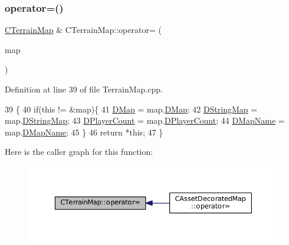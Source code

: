 \subsubsection{\texorpdfstring{operator=()}{operator=()}}
{\footnotesize\ttfamily \hyperlink{classCTerrainMap}{C\+Terrain\+Map} \& C\+Terrain\+Map\+::operator= (\begin{DoxyParamCaption}\item[{const \hyperlink{classCTerrainMap}{C\+Terrain\+Map} \&}]{map }\end{DoxyParamCaption})}



Definition at line 39 of file Terrain\+Map.\+cpp.


\begin{DoxyCode}
39                                                          \{
40     \textcolor{keywordflow}{if}(\textcolor{keyword}{this} != &map)\{
41         \hyperlink{classCTerrainMap_a80d154ce478948b10473534a7bca13f6}{DMap} = map.\hyperlink{classCTerrainMap_a80d154ce478948b10473534a7bca13f6}{DMap};
42         \hyperlink{classCTerrainMap_a76db5fd05e22e0aea413f49175f9c282}{DStringMap} = map.\hyperlink{classCTerrainMap_a76db5fd05e22e0aea413f49175f9c282}{DStringMap};
43         \hyperlink{classCTerrainMap_a79e2cf566ac9dfbaddd2c73ea256785b}{DPlayerCount} = map.\hyperlink{classCTerrainMap_a79e2cf566ac9dfbaddd2c73ea256785b}{DPlayerCount};
44         \hyperlink{classCTerrainMap_a9026e4a5f073885b9e9fc3b43e93caa6}{DMapName} = map.\hyperlink{classCTerrainMap_a9026e4a5f073885b9e9fc3b43e93caa6}{DMapName}; 
45     \}
46     \textcolor{keywordflow}{return} *\textcolor{keyword}{this};
47 \}
\end{DoxyCode}
Here is the caller graph for this function\+:
\nopagebreak
\begin{figure}[H]
\begin{center}
\leavevmode
\includegraphics[width=350pt]{classCTerrainMap_ad9f476d5d4db6de2907dfa3d4d9de7e6_icgraph}
\end{center}
\end{figure}
\hypertarget{classCTerrainMap_a7e0e440467a09cb1c59e2bdbec01ccb4}{}\label{classCTerrainMap_a7e0e440467a09cb1c59e2bdbec01ccb4} 
